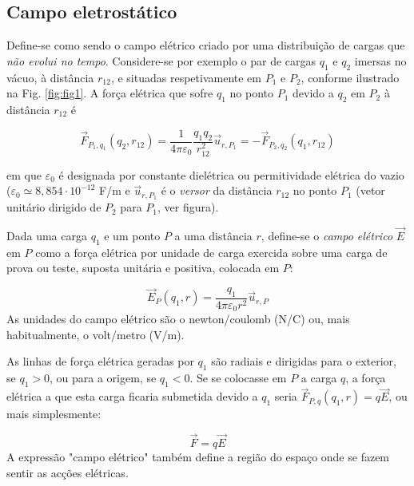 \documentclass[12pt,a4paper,oneside]{paper}
\begin{document}
\subsection{Campo eletrostático}

Define-se como sendo o campo elétrico criado por uma distribuição de cargas que \emph{não evolui no tempo}. Considere-se
por exemplo o par de cargas $q_1$ e $q_2$ imersas no vácuo, à distância $r_{12}$, e situadas respetivamente em $P_1$ e $P_2$,
conforme ilustrado na Fig. \ref{fig:fig1}. A força elétrica que sofre $q_1$ no ponto $P_1$ devido a $q_2$ em $P_2$ à
distância $r_{12}$ é

\begin{equation}
	\vec{F}_{P_1,q_1} (q_2, r_{1 2} ) =\frac{1}{4 \pi \varepsilon_0}\frac{q_1 q_2}{r_{1 2}^2} \vec{u}_{r,P_1} = 
	- \vec{F}_{P_2,q_2} (q_1, r_{1 2} )
\end{equation}

em que $\varepsilon_0$  é designada por constante dielétrica ou permitividade elétrica do vazio ($\varepsilon_0 \simeq 8,854 \cdot 10^{-12}$ F/m
e $\vec{u}_{r,P_1}$  é o \emph{versor} da distância $r_{1 2} $ no ponto $P_1$  (vetor unitário dirigido de $P_2$ para $P_1$,
ver figura).

Dada uma carga $q_1$ e um ponto $P$ a uma distância $r$, define-se o \emph{campo elétrico} $\vec{E}$  em $P$ como a
força elétrica por unidade de carga exercida sobre uma carga de prova ou teste, suposta unitária e positiva, colocada em $P$:

\begin{equation}
	\vec{E}_P (q_1, r) = \frac{q_1}{4 \pi \varepsilon_0 r^2} \vec{u}_{r, P} 
\end{equation}
As unidades do campo elétrico são o newton/coulomb (N/C) ou, mais habitualmente, o volt/metro (V/m).

As linhas de força elétrica geradas por $q_1$ são radiais e dirigidas para o exterior, se $q_1 > 0$, ou para a origem,
se $q_1<0$. Se se colocasse em $P$  a carga $q$,  a força elétrica a que esta carga ficaria submetida devido a $q_1$ 
seria $\vec{F}_{P,q} (q_1, r ) = q \vec{E}$, ou mais simplesmente:

\begin{equation}
\vec{F} = q \vec{E}
\end{equation}
A expressão "campo elétrico" também define a região do espaço onde se fazem sentir as acções elétricas.
\end{document}
